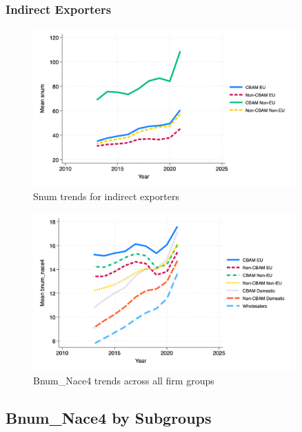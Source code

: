\documentclass{article}
\begin{document}
\subsubsection{Indirect Exporters}
\begin{figure}[h!]
\centering
\includegraphics[width=0.9\textwidth]{snum_indir.png}
\caption{Snum trends for indirect exporters}
\label{fig:snum_indir}
\end{figure}

\begin{figure}[h!]
\centering
\includegraphics[width=0.9\textwidth]{bnum_nace4_main_groups.png}
\caption{Bnum_Nace4 trends across all firm groups}
\label{fig:bnum_nace4_main}
\end{figure}

\subsection{Bnum_Nace4 by Subgroups}
\end{document}
